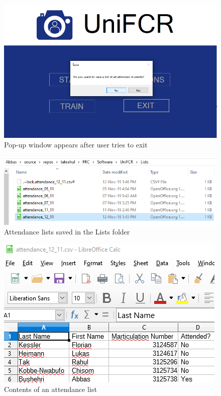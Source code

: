 \documentclass[12pt, a4paper]{article}
\begin{document}
\begin{figure}[htb]
	\centering
		\includegraphics[width=1.0\columnwidth]{images/popup}
	\caption{Pop-up window appears after user tries to exit}
	\label{fig:popup}
\end{figure}
\begin{figure}[htb]
	\centering
		\includegraphics[width=1.0\columnwidth]{images/folder}
	\caption{Attendance lists saved in the Lists folder}
	\label{fig:folder}
\end{figure}
\begin{figure}[htb]
	\centering
		\includegraphics[width=1.0\columnwidth]{images/csv}
	\caption{Contents of an attendance list}
	\label{fig:csv}
\end{figure}
\end{document}
